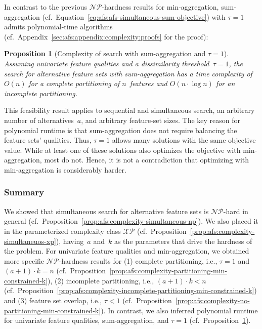 \documentclass{article}
\newtheorem{proposition}{Proposition}
\theoremstyle{definition}
\begin{document}
In contrast to the previous $\mathcal{NP}$-hardness results for min-aggregation, sum-aggregation (cf.~Equation~\ref{eq:afs:afs-simultaneous-sum-objective}) with $\tau=1$ admits polynomial-time algorithms (cf.~Appendix~\ref{sec:afs:appendix:complexity:proofs} for the proof):
%
\begin{proposition}[Complexity of search with sum-aggregation and $\tau=1$]
	Assuming univariate feature qualities and a dissimilarity threshold~$\tau = 1$, the search for alternative feature sets with sum-aggregation has a time complexity of $O(n)$ for a complete partitioning of $n$~features and $O(n \cdot \log n)$ for an incomplete partitioning.
	\label{prop:afs:complexity-partitioning-sum}
\end{proposition}
%
This feasibility result applies to sequential and simultaneous search, an arbitrary number of alternatives~$a$, and arbitrary feature-set sizes.
The key reason for polynomial runtime is that sum-aggregation does not require balancing the feature sets' qualities.
Thus, $\tau=1$ allows many solutions with the same objective value.
While at least one of these solutions also optimizes the objective with min-aggregation, most do not.
Hence, it is not a contradiction that optimizing with min-aggregation is considerably harder.

\subsubsection{Summary}
\label{sec:afs:approach:complexity:summary}

We showed that simultaneous search for alternative feature sets is $\mathcal{NP}$-hard in general (cf.~Proposition~\ref{prop:afs:complexity-simultaneous-np}).
We also placed it in the parameterized complexity class $\mathcal{XP}$ (cf.~Proposition~\ref{prop:afs:complexity-simultaneuos-xp}), having~$a$ and~$k$ as the parameters that drive the hardness of the problem.
For univariate feature qualities and min-aggregation, we obtained more specific $\mathcal{NP}$-hardness results for (1) complete partitioning, i.e., $\tau = 1$ and $(a+1) \cdot k = n$ (cf.~Proposition~\ref{prop:afs:complexity-partitioning-min-constrained-k}), (2) incomplete partitioning, i.e., $(a+1) \cdot k < n$ (cf.~Proposition~\ref{prop:afs:complexity-incomplete-partitioning-min-constrained-k}) and (3) feature set overlap, i.e., $\tau < 1$ (cf.~Proposition~\ref{prop:afs:complexity-no-partitioning-min-constrained-k}).
In contrast, we also inferred polynomial runtime for univariate feature qualities, sum-aggregation, and $\tau = 1$ (cf.~Proposition~\ref{prop:afs:complexity-partitioning-sum}).
\end{document}
